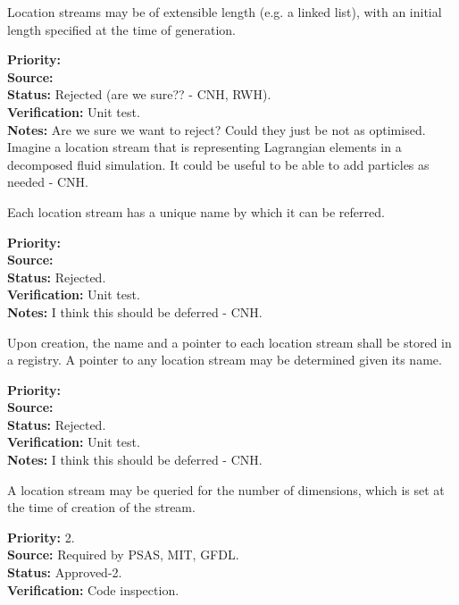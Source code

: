 Location streams may be of extensible length (e.g. a linked list),
with an initial length specified at the time of generation.
\begin{reqlist}
{\bf Priority:} \\
{\bf Source:} \\
{\bf Status:} Rejected (are we sure?? - CNH, RWH). \\
{\bf Verification:} Unit test.\\
{\bf Notes:} Are we sure we want to reject? Could they just be
not as optimised. Imagine a location stream that is representing Lagrangian
elements in a decomposed fluid simulation. It could be useful to
be able to add particles as needed - CNH.
\end{reqlist}

Each location stream has a unique name by which it can be referred.
\begin{reqlist}
{\bf Priority:} \\
{\bf Source:} \\
{\bf Status:} Rejected. \\
{\bf Verification:} Unit test. \\
{\bf Notes:} I think this should be deferred - CNH.
\end{reqlist}

Upon creation, the name and a pointer to each location stream shall be stored in a
registry.  A pointer to any location stream may be determined given its name.
\begin{reqlist}
{\bf Priority:} \\
{\bf Source:} \\
{\bf Status:} Rejected. \\
{\bf Verification:} Unit test. \\
{\bf Notes:} I think this should be deferred - CNH.
\end{reqlist}

A location stream may be queried for the number of dimensions, which is
set at the time of creation of the stream.
\begin{reqlist}
{\bf Priority:} 2. \\
{\bf Source:} Required by PSAS, MIT, GFDL.\\
{\bf Status:} Approved-2. \\
{\bf Verification:} Code inspection.
\end{reqlist}

